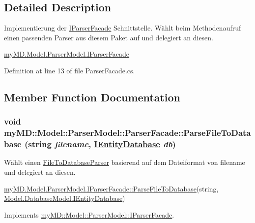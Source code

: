 \subsection{Detailed Description}
Implementierung der \hyperlink{interfacemy_m_d_1_1_model_1_1_parser_model_1_1_i_parser_facade}{IParser\-Facade} Schnittstelle. W\"{a}hlt beim Methodenaufruf einen passenden Parser aus diesem Paket auf und delegiert an diesen. 

\hyperlink{interfacemy_m_d_1_1_model_1_1_parser_model_1_1_i_parser_facade}{my\-MD.Model.Parser\-Model.IParser\-Facade} 



Definition at line 13 of file Parser\-Facade.cs.

\subsection{Member Function Documentation}
\hypertarget{classmy_m_d_1_1_model_1_1_parser_model_1_1_parser_facade_6ffe5b6c5af78ec3e9cdb29a04560a9f}{
\subsubsection[ParseFileToDatabase]{\setlength{\rightskip}{0pt plus 5cm}void my\-MD::Model::Parser\-Model::Parser\-Facade::Parse\-File\-To\-Database (string {\em filename}, \hyperlink{interfacemy_m_d_1_1_model_1_1_database_model_1_1_i_entity_database}{IEntity\-Database} {\em db})}}
\label{d6/d36/classmy_m_d_1_1_model_1_1_parser_model_1_1_parser_facade_6ffe5b6c5af78ec3e9cdb29a04560a9f}


W\"{a}hlt einen \hyperlink{classmy_m_d_1_1_model_1_1_parser_model_1_1_file_to_database_parser}{File\-To\-Database\-Parser} basierend auf dem Dateiformat von filename und delegiert an diesen. 

\hyperlink{interfacemy_m_d_1_1_model_1_1_parser_model_1_1_i_parser_facade_6ffe5b6c5af78ec3e9cdb29a04560a9f}{my\-MD.Model.Parser\-Model.IParser\-Facade::Parse\-File\-To\-Database}(string, \hyperlink{interfacemy_m_d_1_1_model_1_1_database_model_1_1_i_entity_database}{Model.Database\-Model.IEntity\-Database}) 

Implements \hyperlink{interfacemy_m_d_1_1_model_1_1_parser_model_1_1_i_parser_facade_6ffe5b6c5af78ec3e9cdb29a04560a9f}{my\-MD::Model::Parser\-Model::IParser\-Facade}.

